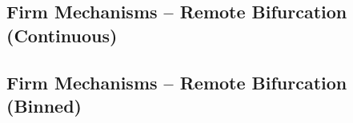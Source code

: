 \documentclass{article}
\newcommand{\cleanedresultsdir}{../results/cleaned}
\begin{document}
\begin{landscape}
\subsection{Firm Mechanisms – Remote Bifurcation (Continuous)}

\end{landscape}

\begin{landscape}
\subsection{Firm Mechanisms – Remote Bifurcation (Binned)}

\end{landscape}
\end{document}
